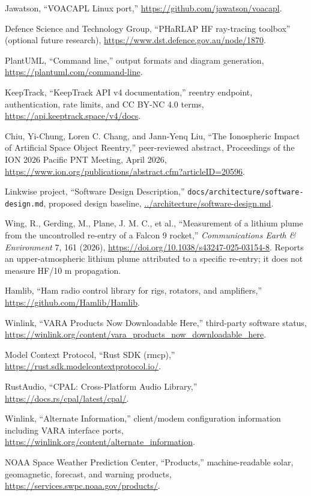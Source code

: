 \documentclass[11pt,a4paper]{article}
\begin{document}
\begin{enumerate}[label={[\arabic*]}]
  \item Jawatson, “VOACAPL Linux port,” \url{https://github.com/jawatson/voacapl}.
  \item Defence Science and Technology Group, “PHaRLAP HF ray-tracing toolbox” (optional future research), \url{https://www.dst.defence.gov.au/node/1870}.
  \item PlantUML, “Command line,” output formats and diagram generation, \url{https://plantuml.com/command-line}.
  \item KeepTrack, “KeepTrack API v4 documentation,” reentry endpoint, authentication, rate limits, and CC BY-NC 4.0 terms, \url{https://api.keeptrack.space/v4/docs}.
  \item Chiu, Yi-Chung, Loren C. Chang, and Jann-Yenq Liu, “The Ionospheric Impact of Artificial Space Object Reentry,” peer-reviewed abstract, Proceedings of the ION 2026 Pacific PNT Meeting, April 2026, \url{https://www.ion.org/publications/abstract.cfm?articleID=20596}.
  \item Linkwise project, “Software Design Description,” \texttt{docs/architecture/software-design.md}, proposed design baseline, \url{../architecture/software-design.md}.
  \item Wing, R., Gerding, M., Plane, J. M. C., et al., “Measurement of a lithium plume from the uncontrolled re-entry of a Falcon 9 rocket,” \emph{Communications Earth \& Environment} 7, 161 (2026), \url{https://doi.org/10.1038/s43247-025-03154-8}. Reports an upper-atmospheric lithium plume attributed to a specific re-entry; it does not measure HF/10 m propagation.
  \item Hamlib, “Ham radio control library for rigs, rotators, and amplifiers,” \url{https://github.com/Hamlib/Hamlib}.
  \item Winlink, “VARA Products Now Downloadable Here,” third-party software status, \url{https://winlink.org/content/vara_products_now_downloadable_here}.
  \item Model Context Protocol, “Rust SDK (rmcp),” \url{https://rust.sdk.modelcontextprotocol.io/}.
  \item RustAudio, “CPAL: Cross-Platform Audio Library,” \url{https://docs.rs/cpal/latest/cpal/}.
  \item Winlink, “Alternate Information,” client/modem configuration information including VARA interface ports, \url{https://winlink.org/content/alternate_information}.
  \item NOAA Space Weather Prediction Center, “Products,” machine-readable solar, geomagnetic, forecast, and warning products, \url{https://services.swpc.noaa.gov/products/}.

\end{enumerate}
\end{document}
